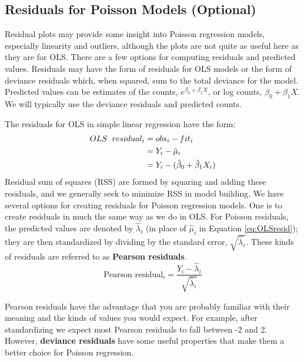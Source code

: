 \documentclass[
]{krantz}
\begin{document}
\hypertarget{sec-PoisResid}{%
\subsection{Residuals for Poisson Models (Optional)}\label{sec-PoisResid}}

Residual plots may provide some insight into Poisson regression models, especially linearity and outliers, although the plots are not quite as useful here as they are for OLS. There are a few options for computing residuals and predicted values. Residuals may have the form of residuals for OLS models or the form of deviance residuals which, when squared, sum to the total deviance for the model. Predicted values can be estimates of the counts, \(e^{\beta_0+\beta_1X}\), or log counts, \(\beta_0+\beta_1X\). We will typically use the deviance residuals and predicted counts.

The residuals for OLS in simple linear regression have the form:
\begin{align}
 OLS\hspace{2mm}residual_i  &= obs_i - fit_i \nonumber \\
&={Y_i-\hat{\mu}_i} \nonumber \\
 &= Y_i-(\hat{\beta}_0 +\hat{\beta}_1 X_i)
\label{eq:OLSresid}
 \end{align}
Residual sum of squares (RSS) are formed by squaring and adding these residuals, and we generally seek to minimize RSS in model building. We have several options for creating residuals for Poisson regression models. One is to create residuals in much the same way as we do in OLS. For Poisson residuals, the predicted values are denoted by \(\hat{\lambda}_i\) (in place of \(\hat{\mu}_i\) in Equation \eqref{eq:OLSresid}); they are then standardized by dividing by the standard error, \(\sqrt{\hat{\lambda}_i}\). These kinds of residuals are referred to as \textbf{Pearson residuals}.
\begin{equation}
\textrm{Pearson residual}_i = \frac{Y_i-\hat{\lambda}_i}{\sqrt{\hat{\lambda}_i}}
\label{eq:pearson}
\end{equation}

Pearson residuals have the advantage that you are probably familiar with their meaning and the kinds of values you would expect. For example, after standardizing we expect most Pearson residuals to fall between -2 and 2. However, \textbf{deviance residuals} have some useful properties that make them a better choice for Poisson regression.
\end{document}
